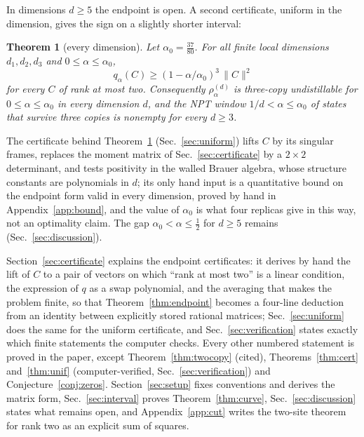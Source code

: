 \documentclass[aps,pra,twocolumn,superscriptaddress,nofootinbib,longbibliography]{revtex4-2}
\theoremstyle{plain}
\newtheorem{theorem}{Theorem}[section]
\theoremstyle{definition}
\theoremstyle{remark}
\begin{document}
In dimensions $d\ge5$ the endpoint is open. A second certificate, uniform in the dimension, gives the sign on a slightly shorter interval:

\begin{theorem}[every dimension]\label{thm:uniformthm}
Let $\alpha_0=\tfrac{37}{80}$. For all finite local dimensions $d_1,d_2,d_3$ and $0\le\alpha\le\alpha_0$,
\begin{equation}\label{eq:unifbound}
q_\alpha(C)\ge(1-\alpha/\alpha_0)^3\,\|C\|^2
\end{equation}
for every $C$ of rank at most two. Consequently $\rho^{(d)}_\alpha$ is three-copy undistillable for $0\le\alpha\le\alpha_0$ in every dimension $d$, and the NPT window $1/d<\alpha\le\alpha_0$ of states that survive three copies is nonempty for every $d\ge3$.
\end{theorem}

The certificate behind Theorem~\ref{thm:uniformthm} (Sec.~\ref{sec:uniform}) lifts $C$ by its singular frames, replaces the moment matrix of Sec.~\ref{sec:certificate} by a $2\times2$ determinant, and tests positivity in the walled Brauer algebra, whose structure constants are polynomials in $d$; its only hand input is a quantitative bound on the endpoint form valid in every dimension, proved by hand in Appendix~\ref{app:bound}, and the value of $\alpha_0$ is what four replicas give in this way, not an optimality claim. The gap $\alpha_0<\alpha\le\tfrac12$ for $d\ge5$ remains (Sec.~\ref{sec:discussion}).

Section~\ref{sec:certificate} explains the endpoint certificates: it derives by hand the lift of $C$ to a pair of vectors on which ``rank at most two'' is a linear condition, the expression of $q$ as a swap polynomial, and the averaging that makes the problem finite, so that Theorem~\ref{thm:endpoint} becomes a four-line deduction from an identity between explicitly stored rational matrices; Sec.~\ref{sec:uniform} does the same for the uniform certificate, and Sec.~\ref{sec:verification} states exactly which finite statements the computer checks. Every other numbered statement is proved in the paper, except Theorem~\ref{thm:twocopy} (cited), Theorems~\ref{thm:cert} and~\ref{thm:unif} (computer-verified, Sec.~\ref{sec:verification}) and Conjecture~\ref{conj:zeros}. Section~\ref{sec:setup} fixes conventions and derives the matrix form, Sec.~\ref{sec:interval} proves Theorem~\ref{thm:curve}, Sec.~\ref{sec:discussion} states what remains open, and Appendix~\ref{app:cut} writes the two-site theorem for rank two as an explicit sum of squares.
\end{document}
